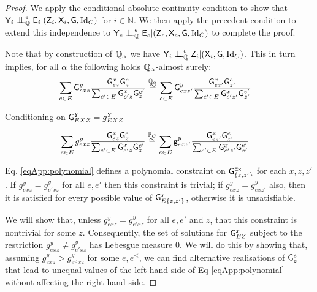 \begin{proof}
We apply the conditional absolute continuity condition to show that $\RV{Y}_i\CI^e_{\prob{Q}} \RV{E}_i|(\RV{Z}_i,\RV{X}_i,\RV{G},\text{Id}_C)$ for $i\in \mathbb{N}$. We then apply the precedent condition to extend this independence to $\RV{Y}_c\CI^e_{\prob{Q}} \RV{E}_c|(\RV{Z}_c,\RV{X}_c,\RV{G},\text{Id}_C)$ to complete the proof.

Note that by construction of $\mathbb{Q}_\alpha$ we have $\RV{Y}_i\CI^e_{\prob{Q}} \RV{Z}_i|(\RV{X}_i,\RV{G},\text{Id}_C)$. This in turn implies, for all $\alpha$ the following holds $\mathbb{Q}_\alpha$-almost surely:
\begin{align}
    \sum_{e\in E} \mathsf{G}^y_{exz}\frac{\mathsf{G}^x_{ez}\mathsf{G}^e_z}{\sum_{e'\in E}\mathsf{G}^x_{e'z}\mathsf{G}^{e'}_z}&\overset{\mathbb{Q}_\alpha}{\cong} \sum_{e\in E} \mathsf{G}^y_{exz'}\frac{\mathsf{G}^x_{ez'}\mathsf{G}^e_{z'}}{\sum_{e'\in E}\mathsf{G}^x_{e'z'}\mathsf{G}^{e'}_{z'}}\label{eqApp:polynomial_base}
\end{align}

Conditioning on $\mathsf{G}^Y_{EXZ}=g^Y_{EXZ}$

\begin{align}
    \sum_{e\in E} g^y_{exz}\frac{\mathsf{G}^x_{ez}\mathsf{G}^e_z}{\sum_{e'\in E}\mathsf{G}^x_{e'z}\mathsf{G}^{e'}_z}&\overset{\mathbb{P}_C}{\cong} \sum_{e\in E} \mathsf{g}^y_{exz'}\frac{\mathsf{G}^x_{ez'}\mathsf{G}^e_{z'}}{\sum_{e'\in E}\mathsf{G}^x_{e'z'}\mathsf{G}^{e'}_{z'}}\label{eqApp:polynomial}
\end{align}

Eq. \eqref{eqApp:polynomial} defines a polynomial constraint on $\mathsf{G}^{\mathsf{Ex}}_{\{z,z'\}}$ for each $x,z,z'$. If $g^y_{exz}=g^y_{e'xz}$ for all $e,e'$ then this constraint is trivial; if $g^y_{exz} = g^y_{exz'}$ also, then it is satisfied for every possible value of $\mathsf{G}^x_{E\{z,z'\}}$, otherwise it is unsatisfiable.

We will show that, unless $g^y_{exz}= g^y_{e'xz}$ for all $e,e'$ and $z$, that this constraint is nontrivial for some $z$. Consequently, the set of solutions for $\mathsf{G}^x_{EZ}$ subject to the restriction $g^y_{exz}\neq g^y_{e'xz}$ has Lebesgue measure 0. We will do this by showing that, assuming $g^y_{exz} > g^y_{e^<xz}$ for some $e,e^<$, we can find alternative realisations of $\mathsf{G}^e_{z}$ that lead to unequal values of the left hand side of Eq \eqref{eqApp:polynomial} without affecting the right hand side.


\end{proof}
